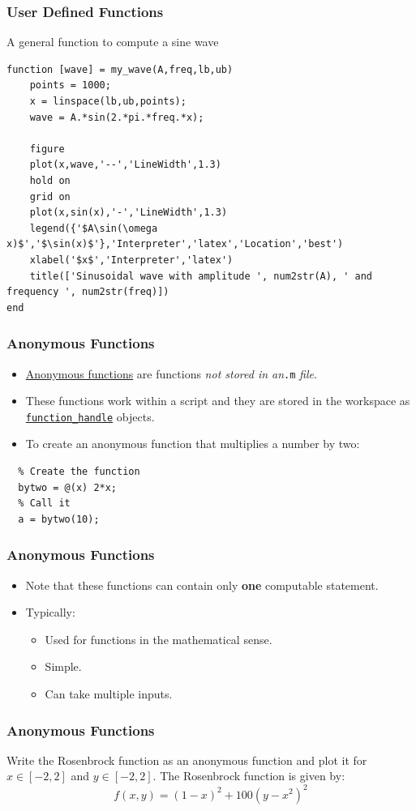 \documentclass[11pt,xcolor={svgnames},aspectratio=169,usepdftitle=false]{beamer}
\begin{document}
\begin{frame}[fragile]
    \frametitle{User Defined Functions}

A general function to compute a sine wave
\begin{lstlisting}
function [wave] = my_wave(A,freq,lb,ub)
    points = 1000;
    x = linspace(lb,ub,points);
    wave = A.*sin(2.*pi.*freq.*x);
    
    figure
    plot(x,wave,'--','LineWidth',1.3)
    hold on
    grid on
    plot(x,sin(x),'-','LineWidth',1.3)
    legend({'$A\sin(\omega x)$','$\sin(x)$'},'Interpreter','latex','Location','best')
    xlabel('$x$','Interpreter','latex')
    title(['Sinusoidal wave with amplitude ', num2str(A), ' and frequency ', num2str(freq)])
end
\end{lstlisting}
\end{frame}

\begin{frame}[fragile]
    \frametitle{Anonymous Functions}
    \begin{itemize}
      \item \href{https://www.mathworks.com/help/matlab/matlab_prog/anonymous-functions.html}{Anonymous functions} are functions \alert{\textit{not stored in an}\texttt{.m} \textit{file}}.
      \item These functions work within a script and they are stored in the workspace as \href{https://www.mathworks.com/help/matlab/ref/function_handle.html}{\texttt{function\_handle}} objects.
      \item To create an anonymous function that multiplies a number by two:
    \end{itemize}
  \begin{lstlisting}
  % Create the function
  bytwo = @(x) 2*x;
  % Call it
  a = bytwo(10);
  \end{lstlisting}
\end{frame}

\begin{frame}[fragile]
    \frametitle{Anonymous Functions}
    \begin{itemize}
        \item Note that these functions can contain only \alert{\textbf{one}} computable statement.
        \item Typically:
        \begin{itemize}
            \item Used for functions in the mathematical sense.
            \item Simple.
            \item Can take multiple inputs.
        \end{itemize}
    \end{itemize}
\end{frame}

\begin{frame}
    \frametitle{Anonymous Functions}
\begin{exercise}
Write the Rosenbrock function as an anonymous function and plot it for $x\in[-2,2]$ and $y\in[-2,2]$. The Rosenbrock function is given by:
\[
f(x,y) = (1 - x)^2 + 100(y - x^2)^2    
\]
\end{exercise}
\end{frame}
\end{document}
